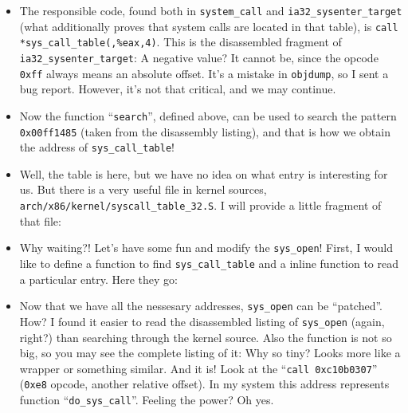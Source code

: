 \documentclass[12pt]{article}
\begin{document}
  \begin{itemize}
  \item The responsible code, found both in \verb!system_call! and
    \verb!ia32_sysenter_target! (what additionally proves that system calls
    are located in that table), is \verb!call *sys_call_table(,%eax,4)!. This
    is the disassembled fragment of \verb!ia32_sysenter_target!:
     A negative value?  It cannot be, since the
    opcode \verb!0xff! always means an absolute offset. It's a mistake in
    \verb!objdump!, so I sent a bug report. However, it's not that critical,
    and we may continue.

  \item Now the function ``\verb!search!'', defined above, can be used to
    search the pattern \verb!0x00ff1485! (taken from the disassembly listing),
    and that is how we obtain the address of \verb!sys_call_table!!

  \item Well, the table is here, but we have no idea on what entry is
    interesting for us. But there is a very useful file in kernel sources,
    \verb!arch/x86/kernel/syscall_table_32.S!. I will provide a little
    fragment of that file: 

  \item Why waiting?! Let's have some fun and modify the \verb!sys_open!!
    First, I would like to define a function to find \verb!sys_call_table! and
    a inline function to read a particular entry. Here they go:
    

  \item Now that we have all the nessesary addresses, \verb!sys_open! can be
    ``patched''. How? I found it easier to read the disassembled listing of
    \verb!sys_open! (again, right?) than searching through the kernel
    source. Also the function is not so big, so you may see the complete
    listing of it:  Why so tiny? Looks more like a
    wrapper or something similar. And it is! Look at the
    ``\verb!call 0xc10b0307!'' (\verb!0xe8! opcode, another relative
    offset). In my system this address represents function
    ``\verb!do_sys_call!''. Feeling the power? Oh yes.
  \end{itemize}
  
  
\end{document}
